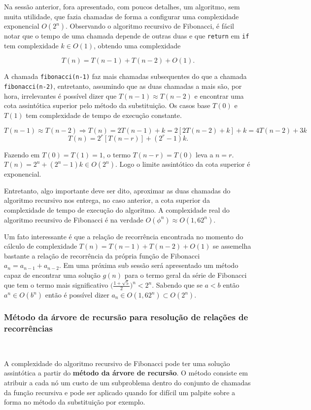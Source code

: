 Na sessão anterior, fora apresentado, com poucos detalhes, um algoritmo, sem muita utilidade, que fazia chamadas de forma a configurar uma complexidade exponencial $O(2^n)$. Observando o algoritmo recursivo de Fibonacci, é fácil notar que o tempo de uma chamada depende de outras duas e que \texttt{return} em \texttt{if} tem complexidade $k \in O(1)$, obtendo uma complexidade

\[T(n) = T(n-1) + T(n-2) + O(1).\]

A chamada \texttt{fibonacci(n-1)} faz mais chamadas subsequentes do que a chamada \texttt{fibonacci(n-2)}, entretanto, assumindo que as duas chamadas a mais são, por hora, irrelevantes é possível dizer que $T(n-1)\approx T(n-2)$ e encontrar uma cota assintótica superior pelo método da substituição. Os casos base $T(0)$ e $T(1)$ tem complexidade de tempo de execução constante.

\[T(n-1)\approx T(n-2) \Rightarrow T(n) = 2T(n-1) + k = 2[2T(n-2)+k]+k = 4T(n-2) + 3k\]
\[T(n) = 2^r[T(n-r)]+(2^{r}-1)k.\]

Fazendo em $T(0)=T(1)=1$, o termo $T(n-r)=T(0)$ leva a $n=r$. $T(n) = 2^n + (2^n-1)k \in O(2^n)$. Logo o limite assintótico da cota superior é exponencial.

Entretanto, algo importante deve ser dito, aproximar as duas chamadas do algoritmo recursivo nos entrega, no caso anterior, a cota superior da complexidade de tempo de execução do algoritmo. A complexidade real do algoritmo recursivo de Fibonacci é na verdade $O(\phi^n)\approx O(1,62^n)$.

Um fato interessante é que a relação de recorrência encontrada no momento do cálculo de complexidade $T(n)=T(n-1)+T(n-2)+O(1)$ se assemelha bastante a relação de recorrência da própria função de Fibonacci $a_n=a_{n-1}+a_{n-2}$. Em uma próxima sub sessão será apresentado um método capaz de encontrar uma solução $g(n)$ para o termo geral da série de Fibonacci que tem o termo mais significativo $\Bigr(\frac{1+\sqrt{5}}{2}\Bigr)^n < 2^n$. Sabendo que se $a<b$ então $a^n \in O(b^n)$ então é possível dizer $a_n \in O(1,62^n) \subset O(2^n)$.

\subsubsection{Método da árvore de recursão para resolução de relações de recorrências}
\

A complexidade do algoritmo recursivo de Fibonacci pode ter uma solução assintótica a partir do \textbf{método da árvore de recursão}. O método consiste em atribuir a cada nó um custo de um subproblema dentro do conjunto de chamadas da função recursiva e pode ser aplicado quando for difícil um palpite sobre a forma no método da substituição por exemplo.

